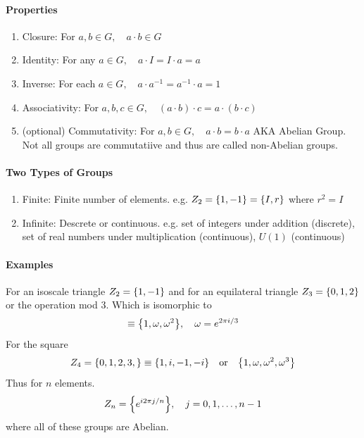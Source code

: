 \documentclass[../main.tex]{subfiles}
\begin{document}
\paragraph{Properties}
\begin{enumerate}
    \item Closure: For $a, b \in G, \quad a \cdot b \in G$
    \item Identity: For any $a \in G, \quad a \cdot I = I \cdot a = a$
    \item Inverse: For each $a \in G, \quad a \cdot a^{-1} = a^{-1} \cdot a = 1$
    \item Associativity: For $a, b, c \in G, \quad (a \cdot b) \cdot c = a \cdot (b \cdot c)$
    \item (optional) Commutativity: For $a, b \in G, \quad a \cdot b = b \cdot a$ AKA Abelian Group.
    Not all groups are commutatiive and thus are called non-Abelian groups.
\end{enumerate}

\paragraph{Two Types of Groups}
\begin{enumerate}
    \item Finite: Finite number of elements. e.g. $Z_2 = \qt{1, -1} = \qt{I, r}$ where $r^2 = I$
    \item Infinite: Descrete or continuous. e.g. set of integers under addition (discrete), set of
    real numbers under multiplication (continuous), $U(1)$ (continuous)
\end{enumerate}

\paragraph{Examples} For an isoscale triangle $Z_2 = \qt{1, -1}$ and for an equilateral triangle
$Z_3 = \qt{0, 1, 2}$ or the operation mod 3. Which is isomorphic to
\begin{align*}
    \equiv \qt{1, \omega, \omega^2}, \quad  \omega = e^{2\pi i/3}
\end{align*}
For the square
\begin{align*}
    Z_4 = \qt{0, 1, 2, 3,} \equiv \qt{1, i, -1, -i} \qor \qt{1, \omega, \omega^2, \omega^3}
\end{align*}
Thus for $n$ elements.
\begin{align*}
    Z_n = \qt{e^{i2\pi j/n}}, \quad j = 0, 1, \dots, n-1
\end{align*}
where all of these groups are Abelian.
\end{document}
